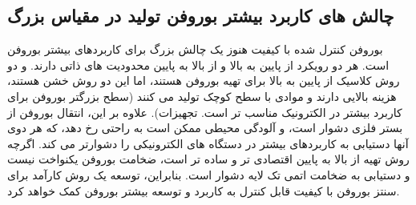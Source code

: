 \subsection{چالش های کاربرد بیشتر بوروفن تولید در مقیاس بزرگ} بوروفن کنترل شده با کیفیت هنوز یک چالش بزرگ برای کاربردهای بیشتر بوروفن است. هر دو رویکرد از پایین به بالا و از بالا به پایین محدودیت های ذاتی دارند.  و  دو روش کلاسیک از پایین به بالا برای تهیه بوروفن هستند، اما این دو روش خشن هستند، هزینه بالایی دارند و موادی با سطح کوچک تولید می کنند (سطح بزرگتر بوروفن برای کاربرد بیشتر در الکترونیک مناسب تر است. تجهیزات). علاوه بر این، انتقال بوروفن از بستر فلزی دشوار است، و آلودگی محیطی ممکن است به راحتی رخ دهد، که هر دوی آنها دستیابی به کاربردهای بیشتر در دستگاه های الکترونیکی را دشوارتر می کند. اگرچه روش تهیه از بالا به پایین اقتصادی تر و ساده تر است، ضخامت بوروفن یکنواخت نیست و دستیابی به ضخامت اتمی تک لایه دشوار است. بنابراین، توسعه یک روش کارآمد برای سنتز بوروفن با کیفیت قابل کنترل به کاربرد و توسعه بیشتر بوروفن کمک خواهد کرد.